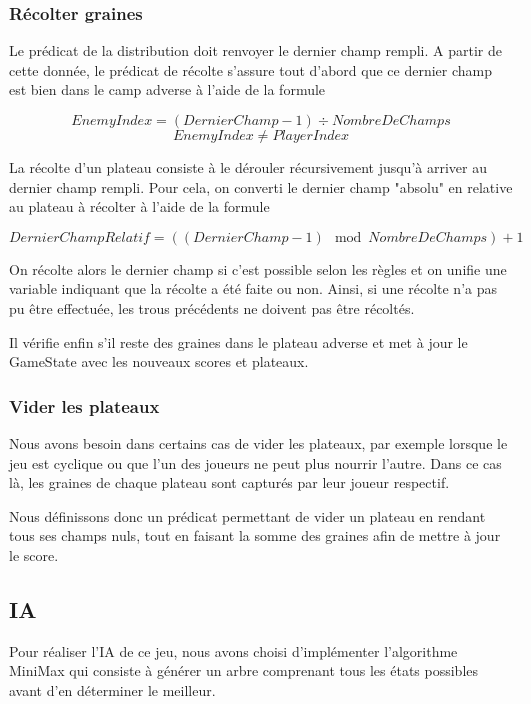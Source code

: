 \documentclass[]{article}
\begin{document}
\subsubsection{Récolter graines}

Le prédicat de la distribution doit renvoyer le dernier champ rempli. A partir de cette donnée, le prédicat de récolte s'assure tout d'abord que ce dernier champ est bien dans le camp adverse à l'aide de la formule 

$$EnemyIndex = (DernierChamp-1) \div NombreDeChamps$$
$$EnemyIndex \neq PlayerIndex$$

La récolte d'un plateau consiste à le dérouler récursivement jusqu'à arriver au dernier champ rempli. Pour cela, on converti le dernier champ "absolu" en relative au plateau à récolter à l'aide de la formule

$$DernierChampRelatif = ((DernierChamp-1) \mod NombreDeChamps) + 1$$

On récolte alors le dernier champ si c'est possible selon les règles et on unifie une variable indiquant que la récolte a été faite ou non. Ainsi, si une récolte n'a pas pu être effectuée, les trous précédents ne doivent pas être récoltés.


Il vérifie enfin s'il reste des graines dans le plateau adverse et met à jour le GameState avec les nouveaux scores et plateaux. 


\subsubsection{Vider les plateaux}

Nous avons besoin dans certains cas de vider les plateaux, par exemple lorsque le jeu est cyclique ou que l'un des joueurs ne peut plus nourrir l'autre. Dans ce cas là, les graines de chaque plateau sont capturés par leur joueur respectif.

Nous définissons donc un prédicat permettant de vider un plateau en rendant tous ses champs nuls, tout en faisant la somme des graines afin de mettre à jour le score. 

\subsection{IA}

Pour réaliser l'IA de ce jeu, nous avons choisi d'implémenter l'algorithme MiniMax qui consiste à générer un arbre comprenant tous les états possibles avant d'en déterminer le meilleur. 
\end{document}
